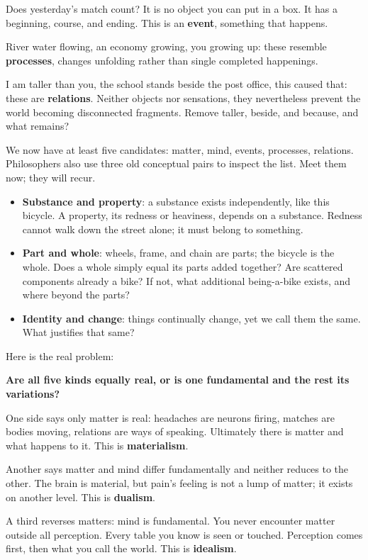 Does yesterday's match count? It is no object you can put in a box. It has a beginning, course, and ending. This is an \textbf{event}, something that happens.

River water flowing, an economy growing, you growing up: these resemble \textbf{processes}, changes unfolding rather than single completed happenings.

I am taller than you, the school stands beside the post office, this caused that: these are \textbf{relations}. Neither objects nor sensations, they nevertheless prevent the world becoming disconnected fragments. Remove taller, beside, and because, and what remains?

We now have at least five candidates: matter, mind, events, processes, relations. Philosophers also use three old conceptual pairs to inspect the list. Meet them now; they will recur.

\begin{itemize}
\item \textbf{Substance and property}: a substance exists independently, like this bicycle. A property, its redness or heaviness, depends on a substance. Redness cannot walk down the street alone; it must belong to something.
\item \textbf{Part and whole}: wheels, frame, and chain are parts; the bicycle is the whole. Does a whole simply equal its parts added together? Are scattered components already a bike? If not, what additional being-a-bike exists, and where beyond the parts?
\item \textbf{Identity and change}: things continually change, yet we call them the same. What justifies that same?
\end{itemize}
Here is the real problem:

\textbf{Are all five kinds equally real, or is one fundamental and the rest its variations?}

One side says only matter is real: headaches are neurons firing, matches are bodies moving, relations are ways of speaking. Ultimately there is matter and what happens to it. This is \textbf{materialism}.

Another says matter and mind differ fundamentally and neither reduces to the other. The brain is material, but pain's feeling is not a lump of matter; it exists on another level. This is \textbf{dualism}.

A third reverses matters: mind is fundamental. You never encounter matter outside all perception. Every table you know is seen or touched. Perception comes first, then what you call the world. This is \textbf{idealism}.

